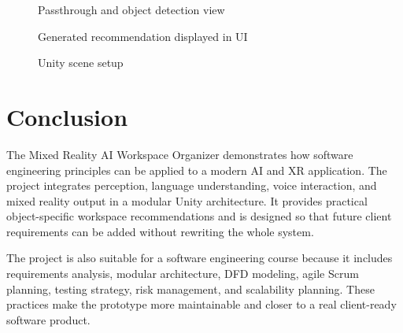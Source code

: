 \documentclass[12pt,a4paper]{article}
\begin{document}
\begin{figure}[h!]
\centering
{}
\caption{Passthrough and object detection view}
\end{figure}

\begin{figure}[h!]
\centering
{}
\caption{Generated recommendation displayed in UI}
\end{figure}

\begin{figure}[h!]
\centering
{}
\caption{Unity scene setup}
\end{figure}

\section{Conclusion}

The Mixed Reality AI Workspace Organizer demonstrates how software engineering principles can be applied to a modern AI and XR application. The project integrates perception, language understanding, voice interaction, and mixed reality output in a modular Unity architecture. It provides practical object-specific workspace recommendations and is designed so that future client requirements can be added without rewriting the whole system.

The project is also suitable for a software engineering course because it includes requirements analysis, modular architecture, DFD modeling, agile Scrum planning, testing strategy, risk management, and scalability planning. These practices make the prototype more maintainable and closer to a real client-ready software product.
\end{document}
